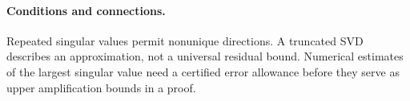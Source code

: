 \paragraph{Conditions and connections.}
Repeated singular values permit nonunique directions. A truncated SVD
describes an approximation, not a universal residual bound. Numerical
estimates of the largest singular value need a certified error allowance
before they serve as upper amplification bounds in a proof.

